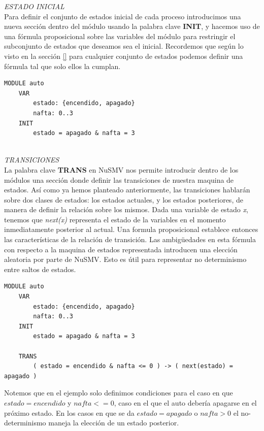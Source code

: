 \documentclass[titlepage, 12pt]{book}
\begin{document}
\textit{ESTADO INICIAL}\\

Para definir el conjunto de estados inicial de cada proceso introducimos una nueva secci\'on dentro del m\'odulo usando la palabra clave \textbf{INIT}, y hacemos uso de una f\'ormula proposicional sobre las variables del m\'odulo para restringir el subconjunto de estados que deseamos sea el inicial. Recordemos que seg\'un lo visto en la secci\'on \ref{} para cualquier conjunto de estados podemos definir una f\'ormula tal que solo ellos la cumplan.
\begin{verbatim}
MODULE auto
    VAR
        estado: {encendido, apagado}
        nafta: 0..3
    INIT
        estado = apagado & nafta = 3
\end{verbatim}
~\\

\textit{TRANSICIONES}\\

La palabra clave \textbf{TRANS} en NuSMV nos permite introducir dentro de los m\'odulos una secci\'on donde definir las transiciones de nuestra maquina de estados. As\'i como ya hemos planteado anteriormente, las transiciones hablar\'an sobre dos clases de estados: los estados actuales, y los estados posteriores, de manera de definir la relaci\'on sobre los mismos. Dada una variable de estado \textit{x}, tenemos que \textit{next(x)} representa el estado de la variables en el momento inmediatamente posterior al actual. Una formula proposicional establece entonces las caracter\'isticas de la relaci\'on de transici\'on. Las ambigüedades en esta f\'ormula con respecto a la maquina de estados representada introducen una elecci\'on aleatoria por parte de NuSMV. Esto es \'util para representar no determinismo entre saltos de estados.

\begin{verbatim}
MODULE auto
    VAR
        estado: {encendido, apagado}
        nafta: 0..3
    INIT
        estado = apagado & nafta = 3

    TRANS
        ( estado = encendido & nafta <= 0 ) -> ( next(estado) = apagado )

\end{verbatim}

Notemos que en el ejemplo solo definimos condiciones para el caso en que $estado = encendido$ y $nafta <= 0$, caso en el que el auto deber\'ia apagarse en el pr\'oximo estado. En los casos en que se da $estado = apagado$ o $nafta > 0$ el no-determinismo maneja la elecci\'on de un estado posterior.\\\\
\end{document}
